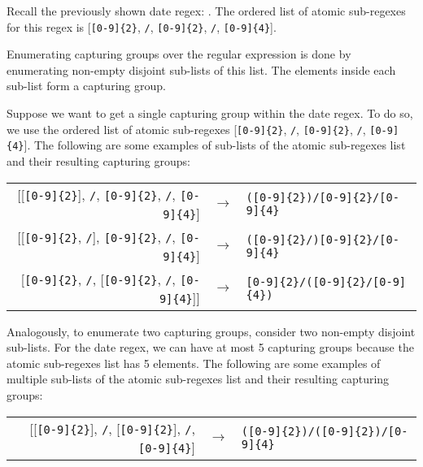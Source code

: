 \begin{example}
Recall the previously shown date regex: . The ordered list of atomic sub-regexes for this regex is [\verb![0-9]{2}!, \verb!/!, \verb![0-9]{2}!, \verb!/!, \verb![0-9]{4}!].
\end{example}

Enumerating capturing groups over the regular expression is done by enumerating non-empty disjoint sub-lists of this list. The elements inside each sub-list form a capturing group.

\begin{example}
Suppose we want to get a single capturing group within the date regex. %
To do so, we use the ordered list of atomic sub-regexes [\verb![0-9]{2}!, \verb!/!, \verb![0-9]{2}!, \verb!/!, \verb![0-9]{4}!].
The following are some examples of sub-lists of the atomic sub-regexes list and their resulting capturing groups:

\begin{center}
\setlength{\extrarowheight}{10pt}
\begin{tabular}{rcl}
[[\verb![0-9]{2}!], \verb!/!, \verb![0-9]{2}!, \verb!/!, \verb![0-9]{4}!] & $\rightarrow$ & \verb!([0-9]{2})/[0-9]{2}/[0-9]{4}! \\

[[\verb![0-9]{2}!, \verb!/!], \verb![0-9]{2}!, \verb!/!, \verb![0-9]{4}!] & $\rightarrow$ & \verb!([0-9]{2}/)[0-9]{2}/[0-9]{4}! \\

[\verb![0-9]{2}!, \verb!/!, [\verb![0-9]{2}!, \verb!/!, \verb![0-9]{4}!]] & $\rightarrow$ & \verb![0-9]{2}/([0-9]{2}/[0-9]{4})!
\end{tabular}\bigskip
\end{center}

\noindent
Analogously, to enumerate two capturing groups, consider two non-empty disjoint sub-lists. For the date regex, we can have at most 5 capturing groups because the atomic sub-regexes list has 5 elements. The following are some examples of multiple sub-lists of the atomic sub-regexes list and their resulting capturing groups:

\begin{center}
\setlength{\extrarowheight}{10pt}
\begin{tabular}{rcl}
[[\verb![0-9]{2}!], \verb!/!, [\verb![0-9]{2}!], \verb!/!, \verb![0-9]{4}!] & $\rightarrow$ & \verb!([0-9]{2})/([0-9]{2})/[0-9]{4}! \\


\end{tabular}
\end{center}
\end{example}
